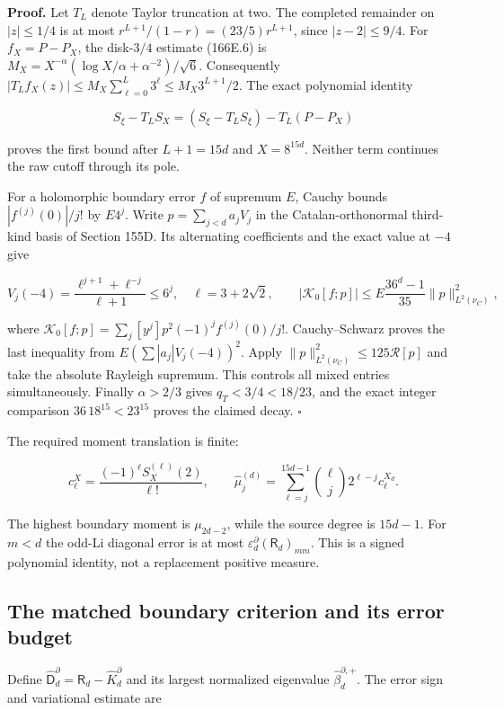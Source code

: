 \documentclass[
  11pt,
]{book}
\begin{document}
\textbf{Proof.} Let \(T_L\) denote Taylor truncation at two. The
completed remainder on \(|z|\le1/4\) is at most
\(r^{L+1}/(1-r)=(23/5)r^{L+1}\), since \(|z-2|\le9/4\). For
\(f_X=P-P_X\), the disk-\(3/4\) estimate (166E.6) is
\(M_X=X^{-\alpha}(\log X/\alpha+\alpha^{-2})/\sqrt6\). Consequently
\(|T_Lf_X(z)|\le M_X\sum_{\ell=0}^L3^\ell
\le M_X3^{L+1}/2\). The exact polynomial identity

\[
S_\xi-T_LS_X=(S_\xi-T_LS_\xi)-T_L(P-P_X)
\tag{166G.6}
\]

proves the first bound after \(L+1=15d\) and \(X=8^{15d}\). Neither term
continues the raw cutoff through its pole.

For a holomorphic boundary error \(f\) of supremum \(E\), Cauchy bounds
\(|f^{(j)}(0)|/j!\) by \(E4^j\). Write \(p=\sum_{j<d}a_jV_j\) in the
Catalan-orthonormal third-kind basis of Section 155D. Its alternating
coefficients and the exact value at \(-4\) give

\[
 V_j(-4)=\frac{\ell^{j+1}+\ell^{-j}}{\ell+1}\le6^j,
 \quad\ell=3+2\sqrt2,\qquad
 |\mathcal K_0[f;p]|\le
 E\frac{36^d-1}{35}\|p\|_{L^2(\nu_C)}^2,
\tag{166G.7}
\]

where \(\mathcal K_0[f;p]=\sum_j[y^j]p^2(-1)^jf^{(j)}(0)/j!\).
Cauchy--Schwarz proves the last inequality from
\(E(\sum|a_j|V_j(-4))^2\). Apply
\(\|p\|_{L^2(\nu_C)}^2\le125\mathcal R[p]\) and take the absolute
Rayleigh supremum. This controls all mixed entries simultaneously.
Finally \(\alpha>2/3\) gives \(q_T<3/4<18/23\), and the exact integer
comparison \(36\,18^{15}<23^{15}\) proves the claimed decay. \(\square\)

The required moment translation is finite:

\[
 c_\ell^X=\frac{(-1)^\ell S_X^{(\ell)}(2)}{\ell!},\qquad
 \widehat\mu_j^{(d)}=\sum_{\ell=j}^{15d-1}
 \binom\ell j2^{\ell-j}c_\ell^{X_d}.
\tag{166G.8}
\]

The highest boundary moment is \(\mu_{2d-2}\), while the source degree
is \(15d-1\). For \(m<d\) the odd-Li diagonal error is at most
\(\varepsilon_d^\partial(\mathsf R_d)_{mm}\). This is a signed
polynomial identity, not a replacement positive measure.

\subsection{The matched boundary criterion and its error
budget}\label{the-matched-boundary-criterion-and-its-error-budget}

Define
\(\widehat{\mathsf D}_d^\partial=\mathsf R_d-\widehat K_d^\partial\) and
its largest normalized eigenvalue \(\widehat\beta_d^{\partial,+}\). The
error sign and variational estimate are
\end{document}
